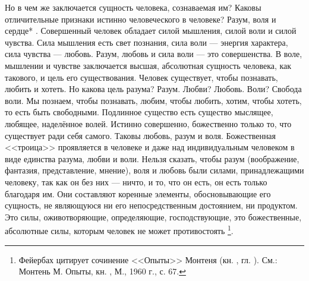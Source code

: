 \documentclass[12pt,oneside]{book}
\newcommand{\rom}[1]{\uppercase\expandafter{\romannumeral #1\relax}}
\begin{document}
Но в чем же заключается сущность человека, сознаваемая им? Каковы отличительные признаки истинно человеческого в человеке? Разум, воля и сердце*\let\svthefootnote\thefootnote
\let\thefootnote\relax{}
\let\thefootnote\svthefootnote. Совершенный человек обладает силой мышления, силой воли и силой чувства. Сила мышления есть свет познания, сила воли --- энергия характера, сила чувства --- любовь. Разум, любовь и сила воли --- это совершенства. В воле, мышлении и чувстве заключается высшая, абсолютная сущность человека, как такового, и цель его существования. Человек существует, чтобы познавать, любить и хотеть. Но какова цель разума? Разум. Любви? Любовь. Воли? Свобода воли. Мы познаем, чтобы познавать, любим, чтобы любить, хотим, чтобы хотеть, то есть быть свободными. Подлинное существо есть существо мыслящее, любящее, наделённое волей. Истинно совершенно, божественно только то, что существует ради себя самого. Таковы любовь, разум и воля. Божественная <<троица>> проявляется в человеке и даже над индивидуальным человеком в виде единства разума, любви и воли. Нельзя сказать, чтобы разум (воображение, фантазия, представление, мнение), воля и любовь были силами, принадлежащими человеку, так как он без них --- ничто, и то, что он есть, он есть только благодаря им. Они составляют коренные элементы, обосновывающие его сущность, не являющуюся ни его непосредственным достоянием, ни продуктом. Это силы, оживотворяющие, определяющие, господствующие, это божественные, абсолютные силы, которым человек не может противостоять\dag\let\svthefootnote\thefootnote
\let\thefootnote\relax{}\let\thefootnote\svthefootnote\footnote{Фейербах цитирует сочинение <<Опыты>> Монтеня (кн. \rom{1}, гл. \rom{14}). См.: Монтень М. Опыты, кн. \rom{1}, М., 1960 г., с. 67.}.
\end{document}

